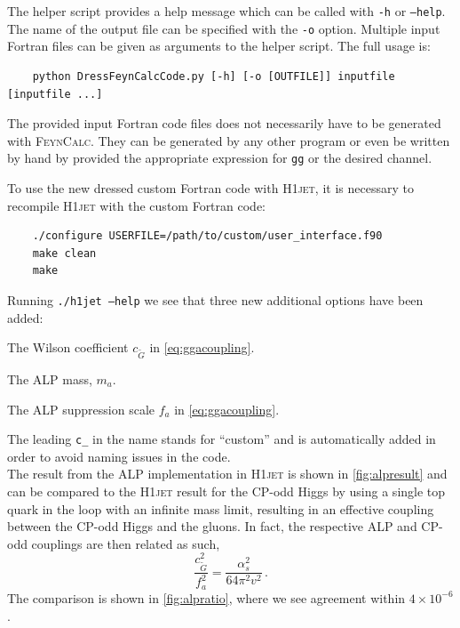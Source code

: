 \documentclass[12pt]{article}
\begin{document}
The helper script provides a help message which can be called with
\texttt{-h} or \texttt{--help}. The name of the output file can be
specified with the \texttt{-o} option. Multiple input Fortran files
can be given as arguments to the helper script. The full usage is:
\begin{lstlisting}
	python DressFeynCalcCode.py [-h] [-o [OUTFILE]] inputfile [inputfile ...] 
\end{lstlisting}
The provided input Fortran code files does not necessarily have to be
generated with \textsc{FeynCalc}. They can be generated by any other
program or even be written by hand by provided the appropriate
expression for \texttt{gg} or the desired channel.

To use the new dressed custom Fortran code with \textsc{H1jet}, it is necessary to recompile \textsc{H1jet} with the custom Fortran code: 
\begin{lstlisting}
	./configure USERFILE=/path/to/custom/user_interface.f90 
	make clean
	make 
\end{lstlisting}
Running \texttt{./h1jet --help} we see that three new additional options have been added: 
\begin{description}[labelindent=\parindent, labelwidth =\widthof{\bfseries9999999999999999999999}, leftmargin = !] 
	\item[\texttt{--c\_CGtil <value>}] The Wilson coefficient $c_{\tilde{G}}$ in \eqref{eq:ggacoupling}. 
	\item[\texttt{--c\_mA <value>}] The ALP mass, $m_a$. 
	\item[\texttt{--c\_fa <value>}] The ALP suppression scale $f_a$ in \eqref{eq:ggacoupling}. 
\end{description}
The leading \texttt{c\_} in the name stands for ``custom'' and is automatically added in order to avoid naming issues in the code. \\ 

The result from the ALP implementation in \textsc{H1jet} is shown in \autoref{fig:alpresult} and can be compared to the \textsc{H1jet} result for the CP-odd Higgs by using a single top quark in the loop with an infinite mass limit, resulting in an effective coupling between the CP-odd Higgs and the gluons. In fact, the respective ALP and CP-odd couplings are then related as such, 
\begin{equation}
	\frac{c_{\tilde{G}}^2}{f_a^2} = \frac{\alpha_s^2}{64 \pi^2 v^2} \,. 
\end{equation}
The comparison is shown in \autoref{fig:alpratio}, where we see agreement within $4\times 10^{-6}$. 
\end{document}
